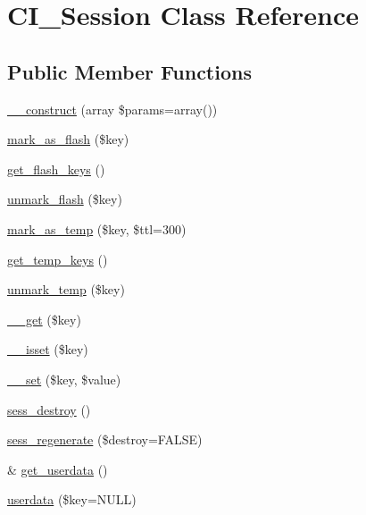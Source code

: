 \hypertarget{class_c_i___session}{}\section{C\+I\+\_\+\+Session Class Reference}
\label{class_c_i___session}
\subsection*{Public Member Functions}
\begin{DoxyCompactItemize}
\item 
\mbox{\hyperlink{class_c_i___session_a85ac5b7f54ad67ec6b5b9dc282717602}{\+\_\+\+\_\+construct}} (array \$params=array())
\item 
\mbox{\hyperlink{class_c_i___session_a81fdbc2498fc26532aee037f03dbaf55}{mark\+\_\+as\+\_\+flash}} (\$key)
\item 
\mbox{\hyperlink{class_c_i___session_a996e70387750cdc480712c1585743d8d}{get\+\_\+flash\+\_\+keys}} ()
\item 
\mbox{\hyperlink{class_c_i___session_a8e89303bfdff75a20528986c2bcdba86}{unmark\+\_\+flash}} (\$key)
\item 
\mbox{\hyperlink{class_c_i___session_ab55f3c6806c359d98edd6138ef33ecf0}{mark\+\_\+as\+\_\+temp}} (\$key, \$ttl=300)
\item 
\mbox{\hyperlink{class_c_i___session_a4fd9f48ff9bcf093778529cb7389eddb}{get\+\_\+temp\+\_\+keys}} ()
\item 
\mbox{\hyperlink{class_c_i___session_a602eaf2b4a6936ed9bb8750892fac551}{unmark\+\_\+temp}} (\$key)
\item 
\mbox{\hyperlink{class_c_i___session_a4537dad3b44254124991341cc91b28fb}{\+\_\+\+\_\+get}} (\$key)
\item 
\mbox{\hyperlink{class_c_i___session_ae858fed7cd2822fbceac154138b68baa}{\+\_\+\+\_\+isset}} (\$key)
\item 
\mbox{\hyperlink{class_c_i___session_a79b36d71c6f1d4f9e6c4c3e34c081456}{\+\_\+\+\_\+set}} (\$key, \$value)
\item 
\mbox{\hyperlink{class_c_i___session_a9451d1625c402b8d712aedaa5ebc752d}{sess\+\_\+destroy}} ()
\item 
\mbox{\hyperlink{class_c_i___session_afec342ef8722ac0ce4a672e6cfad60c0}{sess\+\_\+regenerate}} (\$destroy=F\+A\+L\+SE)
\item 
\& \mbox{\hyperlink{class_c_i___session_a85456fcd9f556e20767051fc33762607}{get\+\_\+userdata}} ()
\item 
\mbox{\hyperlink{class_c_i___session_ab10006d10762845f93392ef4c2884df6}{userdata}} (\$key=N\+U\+LL)

\end{DoxyCompactItemize}
